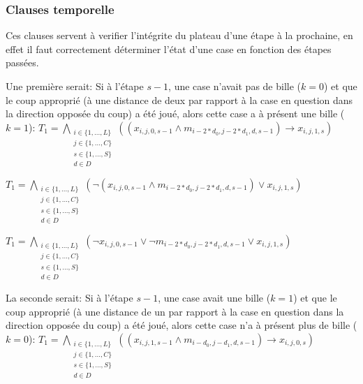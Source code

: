 \documentclass[utf8]{article}
\begin{document}
\subsubsection{Clauses temporelle}
Ces clauses servent à verifier l'intégrite du plateau d'une étape à la prochaine, en effet il faut correctement déterminer l'état d'une case en fonction des étapes passées. \newline

Une première serait: Si à l'étape $s-1$, une case n'avait pas de bille ($k=0$) et que le coup approprié (à une distance de deux par rapport à la case en question dans la direction opposée du coup) a été joué, alors cette case a à présent une bille ($k=1$):\newline
$T_1 = {\underset{\substack{i\in\{1,...,L\} \\ j\in\{1,...,C\} \\ s\in \{1,...,S\}\\ d \in D}}{\bigwedge}}((x_{i,j,0,s-1} \wedge m_{i-2*d_0,j-2*d_1,d,s-1})\rightarrow x_{i,j,1,s})$\newline

$T_1 = {\underset{\substack{i\in\{1,...,L\} \\ j\in\{1,...,C\} \\ s\in \{1,...,S\}\\ d \in D}}{\bigwedge}}(\neg(x_{i,j,0,s-1} \wedge m_{i-2*d_0,j-2*d_1,d,s-1})\vee x_{i,j,1,s})$\newline

$T_1 = {\underset{\substack{i\in\{1,...,L\} \\ j\in\{1,...,C\} \\ s\in \{1,...,S\}\\ d \in D}}{\bigwedge}}(\neg x_{i,j,0,s-1} \vee \neg m_{i-2*d_0,j-2*d_1,d,s-1}\vee x_{i,j,1,s})$\newline

La seconde serait: Si à l'étape $s-1$, une case avait une bille ($k=1$) et que le coup approprié (à une distance de un par rapport à la case en question dans la direction opposée du coup) a été joué, alors cette case n'a à présent plus de bille ($k=0$): \newline
$T_1 = {\underset{\substack{i\in\{1,...,L\} \\ j\in\{1,...,C\} \\ s\in \{1,...,S\}\\ d \in D}}{\bigwedge}}((x_{i,j,1,s-1} \wedge m_{i-d_0,j-d_1,d,s-1})\rightarrow x_{i,j,0,s})$\newline
\end{document}
